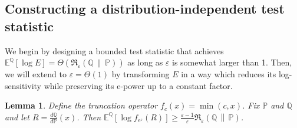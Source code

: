 \documentclass{article}
\newcommand{\Rdiv}[3][\eps]{%
  \mathfrak{R}_{#1}\!\left(#2\,\middle\|\,#3\right)%
}
\newcommand{\Null}{\mathbb{P}}
\newcommand{\E}{\mathbb{E}}
\newcommand{\Alt}{\mathbb{Q}}
\newcommand{\opt}{\Rdiv{\Alt}{\Null}}
\newcommand{\eps}{\varepsilon}
\newtheorem{lemma}{Lemma}[theorem]
\begin{document}
\subsection{Constructing a distribution-independent test statistic}

We begin by designing a bounded test statistic that achieves $\E^\Alt[\log E] = \Theta(\opt)$ as long as $\eps$ is somewhat larger than 1. Then, we will extend to $\eps=\Theta(1)$ by transforming $E$ in a way which reduces its log-sensitivity while preserving its e-power up to a constant factor. 

\begin{lemma}Define the truncation operator $f_c(x) = \min(c,x)$.  Fix $\Null$ and $\Alt$ and let $R = \frac{d\Alt}{d\Null}(x)$. Then $\E^\Alt[\log f_{e^\varepsilon}(R)] \geq \frac{\eps-1}{\eps}\opt$.
\end{lemma}
\end{document}
